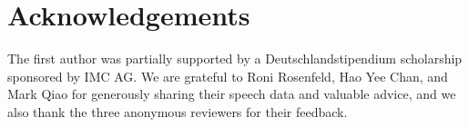 \documentclass[11pt]{article}
\begin{document}

%


\section*{Acknowledgements}
\label{sec:thanks}
%

The first author was partially supported by a Deutschlandstipendium scholarship sponsored by IMC AG. 
We are grateful to Roni Rosenfeld, Hao Yee Chan, and Mark Qiao for 
generously sharing their speech data and valuable advice, and we also thank
the three anonymous reviewers for their feedback.


%
%


\end{document}
